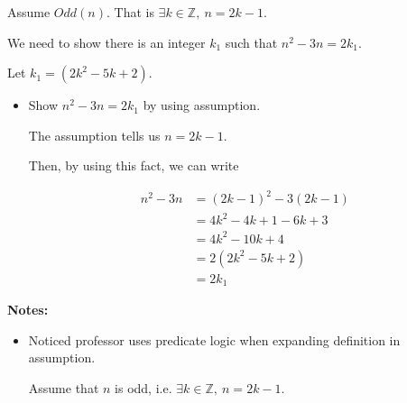 \documentclass[12pt]{article}
\begin{document}
\begin{enumerate}[a.]
\begin{mdframed}
        \bigskip

        Assume $Odd(n)$. That is $\exists k \in \mathbb{Z},\:n = 2k - 1$.

        \bigskip

        We need to show there is an integer $k_1$ such that $n^2 - 3n = 2k_1$.

        \bigskip

        Let $k_1 = (2k^2 - 5k + 2)$.

        \bigskip

        \begin{itemize}
            \item Show $n^2 - 3n = 2k_1$ by using assumption.

            \bigskip

            \begin{mdframed}
            The assumption tells us $n = 2k-1$.

            \bigskip

            Then, by using this fact, we can write

            \begin{align}
                n^2 - 3n &= (2k-1)^2 - 3(2k-1)\\
                &= 4k^2-4k+1-6k+3\\
                &= 4k^2 -10k + 4\\
                &= 2(2k^2 - 5k + 2)\\
                &= 2k_1
            \end{align}
            \end{mdframed}

        \end{itemize}

    \end{mdframed}

    \bigskip

    \textbf{Notes:}

    \begin{itemize}
        \item Noticed professor uses predicate logic when expanding definition in
        assumption.

        \begin{mdframed}
        Assume that $n$ is odd, i.e. $\exists k \in \mathbb{Z},\:n = 2k -1$.
        \end{mdframed}

    \end{itemize}

\end{enumerate}
\end{document}
